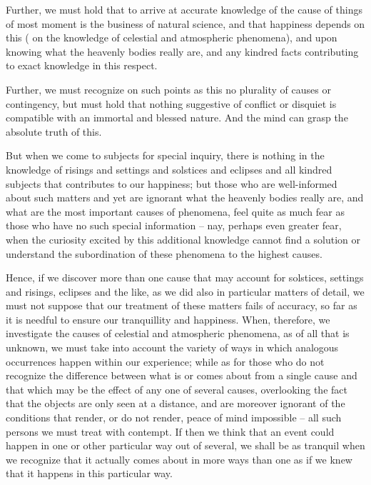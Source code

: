 \documentclass{stex}
\begin{document}
Further, we must hold that to arrive at accurate knowledge of the cause of things of most moment is the business of natural science, and that happiness depends on this (\videlicet{} on the knowledge of celestial and atmospheric phenomena), and upon knowing what the heavenly bodies really are, and any kindred facts contributing to exact knowledge in this respect.

Further, we must recognize on such points as this no plurality of causes or contingency, but must hold that nothing suggestive of conflict or disquiet is compatible with an immortal and blessed nature.
And the mind can grasp the absolute truth of this.

But when we come to subjects for special inquiry, there is nothing in the knowledge of risings and settings and solstices and eclipses and all kindred subjects that contributes to our happiness; but those who are well-informed about such matters and yet are ignorant what the heavenly bodies really are, and what are the most important causes of phenomena, feel quite as much fear as those who have no such special information – nay, perhaps even greater fear, when the curiosity excited by this additional knowledge cannot find a solution or understand the subordination of these phenomena to the highest causes.

Hence, if we discover more than one cause that may account for solstices, settings and risings, eclipses and the like, as we did also in particular matters of detail, we must not suppose that our treatment of these matters fails of accuracy, so far as it is needful to ensure our tranquillity and happiness.
When, therefore, we investigate the causes of celestial and atmospheric phenomena, as of all that is unknown, we must take into account the variety of ways in which analogous occurrences happen within our experience; while as for those who do not recognize the difference between what is or comes about from a single cause and that which may be the effect of any one of several causes, overlooking the fact that the objects are only seen at a distance, and are moreover ignorant of the conditions that render, or do not render, peace of mind impossible – all such persons we must treat with contempt.
If then we think that an event could happen in one or other particular way out of several, we shall be as tranquil when we recognize that it actually comes about in more ways than one as if we knew that it happens in this particular way.
\end{document}
